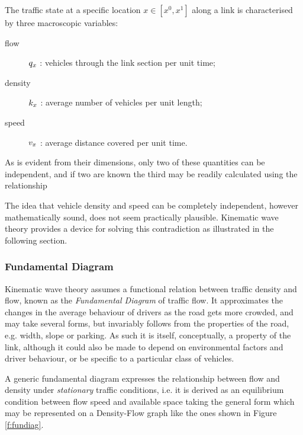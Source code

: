 The traffic state at a specific location $x \in \left[x^0, x^1\right]$ along a link is characterised by three macroscopic variables:
\begin{description}
\item[flow] $q_x$ : vehicles through the link section per unit time;
\item[density] $k_x$ : average number of vehicles per unit length;
\item[speed] $v_x$ : average distance covered per unit time.
\end{description}
As is evident from their dimensions, only two of these quantities can be independent, and if two are known the third may be readily calculated using the relationship

The idea that vehicle density and speed can be completely independent, however mathematically sound, does not seem practically plausible. Kinematic wave theory provides a device for solving this contradiction as illustrated in the following section.

\subsubsection{Fundamental Diagram} \label{s:fundiag}
Kinematic wave theory assumes a functional relation between traffic density and flow, known as the \emph{Fundamental Diagram} of traffic flow. It approximates the changes in the average behaviour of drivers as the road gets more crowded, and may take several forms, but invariably follows from the properties of the road, e.g. width, slope or parking. As such it is itself, conceptually, a property of the link, although it could also be made to depend on environmental factors and driver behaviour, or be specific to a particular class of vehicles.

A generic fundamental diagram expresses the relationship between flow and density under \emph{stationary} traffic conditions, i.e. it is derived as an equilibrium condition between flow speed and available space taking the general form
which may be represented on a Density-Flow graph like the ones shown in Figure \ref{f:fundiag}.

